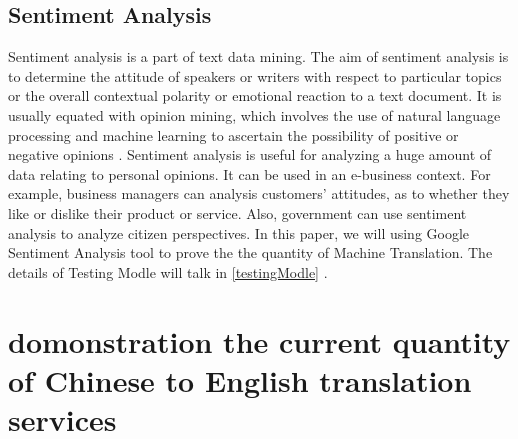 \documentclass[conference]{IEEEtran}
\begin{document}
\begin{CJK*}{UTF8}{gbsn}
\subsection{Sentiment Analysis}
Sentiment analysis is a part of text data mining. The aim of sentiment analysis
is to determine the attitude of speakers or writers with respect to particular
topics or the overall contextual polarity or emotional reaction to a text
document. It is usually equated with opinion mining, which involves the use of
natural language processing and machine learning to ascertain the possibility of
positive or negative opinions \cite{yadollahi2017current}. Sentiment analysis is useful for analyzing a
huge amount of data relating to personal opinions. It can be used in an
e-business context. For example, business managers can analysis customers’
attitudes, as to whether they like or dislike their product or service. Also,
government can use sentiment analysis to analyze citizen perspectives.
In this paper, we will using Google Sentiment Analysis tool to prove the the
quantity of Machine Translation. The details of Testing Modle will talk in \ref{testingModle} .

\section{domonstration the current quantity of Chinese to English translation
  services} \label{currentQuantity}


\end{CJK*}
\end{document}
